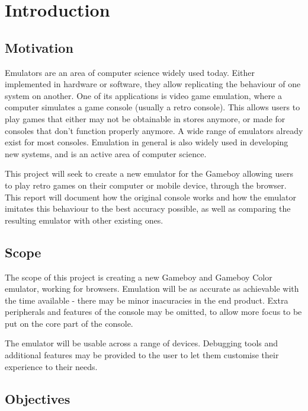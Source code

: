 \documentclass[11pt]{report}
\begin{document}
\clearpage

{\hypersetup{hidelinks}\tableofcontents} 

\clearpage

\chapter{Introduction}

\section{Motivation}

Emulators are an area of computer science widely used today. Either implemented in hardware or software, they allow replicating the behaviour of one system on another. One of its applications is video game emulation, where a computer simulates a game console (usually a retro console). This allows users to play games that either may not be obtainable in stores anymore, or made for consoles that don't function properly anymore. A wide range of emulators already exist for most consoles. Emulation in general is also widely used in developing new systems, and is an active area of computer science.

This project will seek to create a new emulator for the Gameboy allowing users to play retro games on their computer or mobile device, through the browser. This report will document how the original console works and how the emulator imitates this behaviour to the best accuracy possible, as well as comparing the resulting emulator with other existing ones.

\section{Scope}

The scope of this project is creating a new Gameboy and Gameboy Color emulator, working for browsers. Emulation will be as accurate as achievable with the time available - there may be minor inacuracies in the end product. Extra peripherals and features of the console may be omitted, to allow more focus to be put on the core part of the console.

The emulator will be usable across a range of devices. Debugging tools and additional features may be provided to the user to let them customise their experience to their needs.

\section{Objectives}
\end{document}
